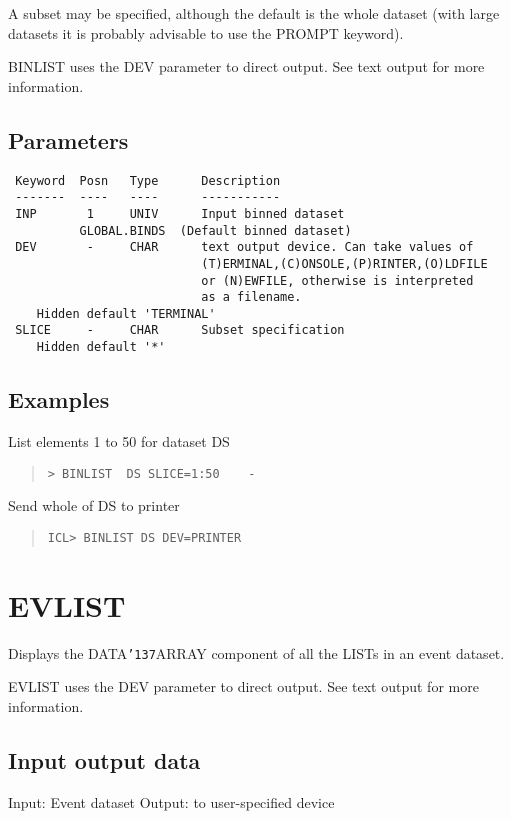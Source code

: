 \documentclass{book}
\renewcommand{\_}{{\tt\char'137}}     %
\begin{document}
A subset may be specified, although the default is the whole
dataset (with large datasets it is probably advisable to use the
PROMPT keyword).

BINLIST uses the DEV parameter to direct output. See text output
for more information.

\subsection{Parameters}
\begin{verbatim}
 Keyword  Posn   Type      Description
 -------  ----   ----      -----------
 INP       1     UNIV      Input binned dataset
          GLOBAL.BINDS  (Default binned dataset)
 DEV       -     CHAR      text output device. Can take values of
                           (T)ERMINAL,(C)ONSOLE,(P)RINTER,(O)LDFILE
                           or (N)EWFILE, otherwise is interpreted
                           as a filename.
    Hidden default 'TERMINAL'
 SLICE     -     CHAR      Subset specification
    Hidden default '*'

\end{verbatim}\subsection{Examples}
List elements 1 to 50 for dataset DS
\begin{quote}\begin{verbatim}
> BINLIST  DS SLICE=1:50    -
\end{verbatim}\end{quote}
Send whole of DS to printer
\begin{quote}\begin{verbatim}
ICL> BINLIST DS DEV=PRINTER
\end{verbatim}\end{quote}
\section{EVLIST}
Displays the DATA\_ARRAY component of all the LISTs in an event
dataset.

EVLIST uses the DEV parameter to direct output. See text output
for more information.

\subsection{Input output data}
Input: Event dataset
Output: to user-specified device
\end{document}
